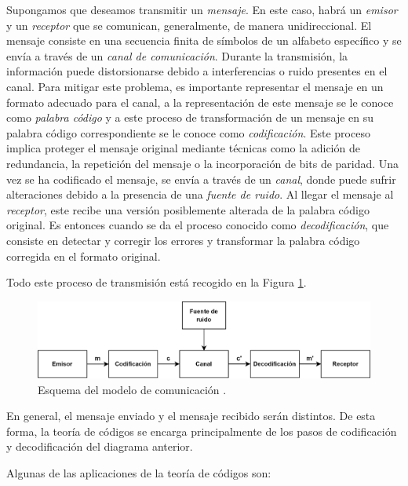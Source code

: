 Supongamos que deseamos transmitir un \emph{mensaje}. En este caso, habrá un \emph{emisor} y un \emph{receptor} que se comunican, generalmente, de manera unidireccional. 
El mensaje consiste en una secuencia finita de símbolos de un alfabeto específico y se envía a través de un \emph{canal de comunicación}. Durante la transmisión, la información puede distorsionarse debido a interferencias o ruido presentes en el canal. Para mitigar este problema, es importante representar el mensaje en un formato adecuado para el canal, a la representación de este mensaje se le conoce como \emph{palabra código} y a este proceso de transformación de un mensaje en su palabra código correspondiente se le conoce como \emph{codificación}. Este proceso implica proteger el mensaje original mediante técnicas como la adición de redundancia, la repetición del mensaje o la incorporación de bits de paridad.
Una vez se ha codificado el mensaje, se envía a través de un \emph{canal}, donde puede sufrir alteraciones debido a la presencia de una \emph{fuente de ruido}. Al llegar el mensaje al \emph{receptor}, este recibe una versión posiblemente alterada de la palabra código original. Es entonces cuando se da el proceso conocido como \emph{decodificación}, que consiste en detectar y corregir los errores y transformar la palabra código corregida en el formato original.

Todo este proceso de transmisión está recogido en la Figura \ref{fig:comunicacion}.

\begin{figure}[H]
    \centering
    \includegraphics[width=1\textwidth]{img/comunicacion.png}
    \caption{Esquema del modelo de comunicación \cite{Podesta2006}.}
    \label{fig:comunicacion}
\end{figure}

En general, el mensaje enviado  y el mensaje recibido serán distintos. De esta forma, la teoría de códigos se encarga principalmente de los pasos de codificación y decodificación del diagrama anterior.

Algunas de las aplicaciones de la teoría de códigos son:


